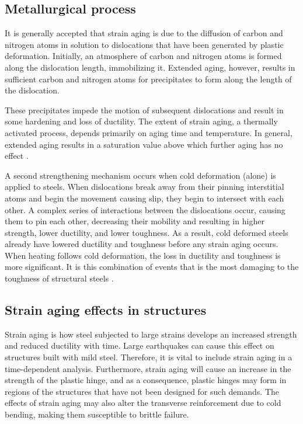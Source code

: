 \subsection{Metallurgical process}

It is generally accepted that strain aging is due to the diffusion of carbon and nitrogen atoms in solution to dislocations that have been generated by plastic deformation. Initially, an atmosphere of carbon and nitrogen atoms is formed along the dislocation length, immobilizing it. Extended aging, however, results in sufficient carbon and nitrogen atoms for precipitates to form along the length of the dislocation\cite{Overby2017}\cite{Hosseini2015}.

These precipitates impede the motion of subsequent dislocations and result in some hardening and loss of ductility. The extent of strain aging, a thermally activated process, depends primarily on aging time and temperature. In general, extended aging results in a saturation value above which further aging has no effect \cite{Restrepo-Posada1994}.

A second strengthening mechanism occurs when cold deformation (alone) is applied to steels. When dislocations break away from their pinning interstitial atoms and begin the movement causing slip, they begin to intersect with each other. A complex series of interactions between the dislocations occur, causing them to pin each other, decreasing their mobility and resulting in higher strength, lower ductility, and lower toughness. As a result, cold deformed steels already have lowered ductility and toughness before any strain aging occurs. When heating follows cold deformation, the loss in ductility and toughness is more significant. It is this combination of events that is the most damaging to the toughness of structural steels \cite{Momtahan2009}.

\subsection{Strain aging effects in structures}

Strain aging is how steel subjected to large strains develops an increased strength and reduced ductility with time. Large earthquakes can cause this effect on structures built with mild steel. Therefore, it is vital to include strain aging in a time-dependent analysis. Furthermore, strain aging will cause an increase in the strength of the plastic hinge, and as a consequence, plastic hinges may form in regions of the structures that have not been designed for such demands. The effects of strain aging may also alter the transverse reinforcement due to cold bending, making them susceptible to brittle failure\cite{Momtahan2009}.

